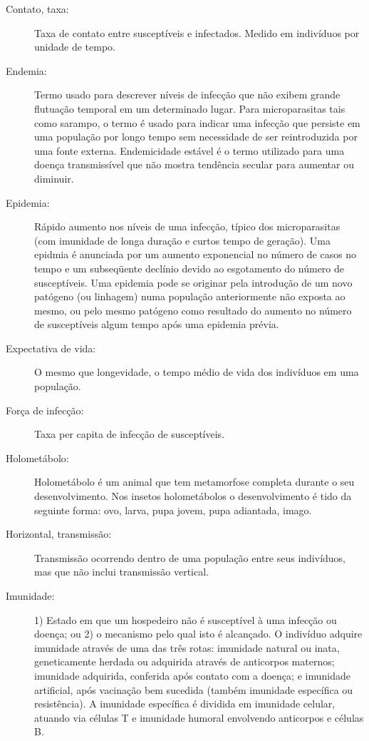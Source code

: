 \begin{description}
\item[Contato, taxa:] Taxa de contato entre susceptíveis e infectados. Medido em indivíduos por unidade de tempo.

\item[Endemia:] Termo usado para descrever níveis de infecção que não exibem grande flutuação temporal em um determinado lugar. Para microparasitas tais como sarampo, o termo é usado para indicar uma infecção que persiste em uma população por longo tempo sem necessidade de ser reintroduzida por uma fonte externa. Endemicidade estável é o termo utilizado para uma doença transmissível que não mostra tendência secular para aumentar ou diminuir.

\item[Epidemia:] Rápido aumento nos níveis de uma infecção, típico dos microparasitas (com imunidade de longa duração e curtos tempo de geração). Uma epidmia é anunciada por um aumento exponencial no número de casos no tempo e um subseqüente declínio devido ao esgotamento do número de susceptíveis. Uma epidemia pode se originar pela introdução de um novo patógeno (ou linhagem) numa população anteriormente não exposta ao mesmo, ou pelo mesmo patógeno como resultado do aumento no número de susceptíveis algum tempo após uma epidemia prévia.

\item[Expectativa de vida:] O mesmo que longevidade, o tempo médio de vida dos indivíduos em uma população.

\item[Força de infecção:] Taxa per capita de infecção de susceptíveis.

\item[Holometábolo:] Holometábolo é um animal que tem metamorfose completa durante o seu desenvolvimento.
Nos insetos holometábolos o desenvolvimento é tido da seguinte forma: ovo, larva, pupa jovem, pupa adiantada, imago.

\item[Horizontal, transmissão:] Transmissão ocorrendo dentro de uma população entre seus indivíduos, mas que não inclui transmissão vertical.

\item[Imunidade:] 1) Estado em que um hospedeiro não é susceptível à uma infecção ou doença; ou 2) o mecanismo pelo qual isto é alcançado. O indivíduo adquire imunidade através de uma das três rotas: imunidade natural ou inata, geneticamente herdada ou adquirida através de anticorpos maternos; imunidade adquirida, conferida após contato com a doença; e imunidade artificial, após vacinação bem sucedida (também imunidade específica ou resistência). A imunidade específica é dividida em imunidade celular, atuando via células T e imunidade humoral envolvendo anticorpos e células B.


\end{description}
